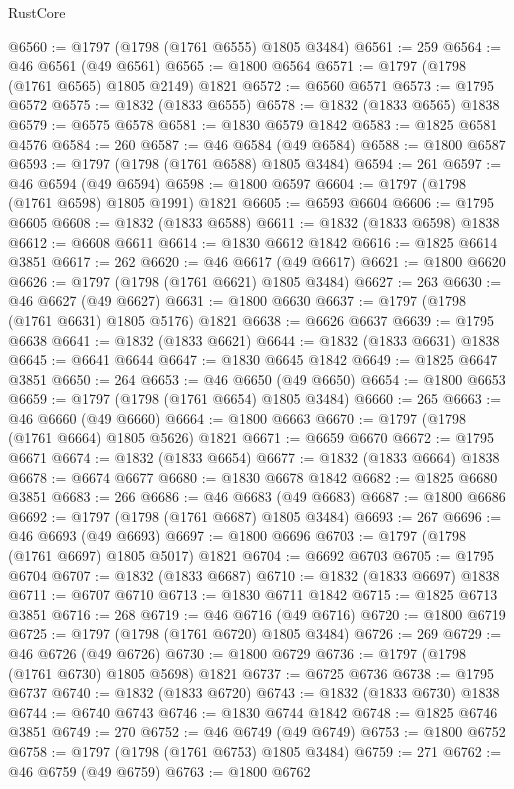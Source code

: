 \begin{lexlean}{RustCore}
\begin{coremodule}
@6560 := @1797 (@1798 (@1761 @6555) @1805 @3484)
@6561 := 259
@6564 := @46 @6561 (@49 @6561)
@6565 := @1800 @6564
@6571 := @1797 (@1798 (@1761 @6565) @1805 @2149) @1821
@6572 := @6560 @6571
@6573 := @1795 @6572
@6575 := @1832 (@1833 @6555)
@6578 := @1832 (@1833 @6565) @1838
@6579 := @6575 @6578
@6581 := @1830 @6579 @1842
@6583 := @1825 @6581 @4576
@6584 := 260
@6587 := @46 @6584 (@49 @6584)
@6588 := @1800 @6587
@6593 := @1797 (@1798 (@1761 @6588) @1805 @3484)
@6594 := 261
@6597 := @46 @6594 (@49 @6594)
@6598 := @1800 @6597
@6604 := @1797 (@1798 (@1761 @6598) @1805 @1991) @1821
@6605 := @6593 @6604
@6606 := @1795 @6605
@6608 := @1832 (@1833 @6588)
@6611 := @1832 (@1833 @6598) @1838
@6612 := @6608 @6611
@6614 := @1830 @6612 @1842
@6616 := @1825 @6614 @3851
@6617 := 262
@6620 := @46 @6617 (@49 @6617)
@6621 := @1800 @6620
@6626 := @1797 (@1798 (@1761 @6621) @1805 @3484)
@6627 := 263
@6630 := @46 @6627 (@49 @6627)
@6631 := @1800 @6630
@6637 := @1797 (@1798 (@1761 @6631) @1805 @5176) @1821
@6638 := @6626 @6637
@6639 := @1795 @6638
@6641 := @1832 (@1833 @6621)
@6644 := @1832 (@1833 @6631) @1838
@6645 := @6641 @6644
@6647 := @1830 @6645 @1842
@6649 := @1825 @6647 @3851
@6650 := 264
@6653 := @46 @6650 (@49 @6650)
@6654 := @1800 @6653
@6659 := @1797 (@1798 (@1761 @6654) @1805 @3484)
@6660 := 265
@6663 := @46 @6660 (@49 @6660)
@6664 := @1800 @6663
@6670 := @1797 (@1798 (@1761 @6664) @1805 @5626) @1821
@6671 := @6659 @6670
@6672 := @1795 @6671
@6674 := @1832 (@1833 @6654)
@6677 := @1832 (@1833 @6664) @1838
@6678 := @6674 @6677
@6680 := @1830 @6678 @1842
@6682 := @1825 @6680 @3851
@6683 := 266
@6686 := @46 @6683 (@49 @6683)
@6687 := @1800 @6686
@6692 := @1797 (@1798 (@1761 @6687) @1805 @3484)
@6693 := 267
@6696 := @46 @6693 (@49 @6693)
@6697 := @1800 @6696
@6703 := @1797 (@1798 (@1761 @6697) @1805 @5017) @1821
@6704 := @6692 @6703
@6705 := @1795 @6704
@6707 := @1832 (@1833 @6687)
@6710 := @1832 (@1833 @6697) @1838
@6711 := @6707 @6710
@6713 := @1830 @6711 @1842
@6715 := @1825 @6713 @3851
@6716 := 268
@6719 := @46 @6716 (@49 @6716)
@6720 := @1800 @6719
@6725 := @1797 (@1798 (@1761 @6720) @1805 @3484)
@6726 := 269
@6729 := @46 @6726 (@49 @6726)
@6730 := @1800 @6729
@6736 := @1797 (@1798 (@1761 @6730) @1805 @5698) @1821
@6737 := @6725 @6736
@6738 := @1795 @6737
@6740 := @1832 (@1833 @6720)
@6743 := @1832 (@1833 @6730) @1838
@6744 := @6740 @6743
@6746 := @1830 @6744 @1842
@6748 := @1825 @6746 @3851
@6749 := 270
@6752 := @46 @6749 (@49 @6749)
@6753 := @1800 @6752
@6758 := @1797 (@1798 (@1761 @6753) @1805 @3484)
@6759 := 271
@6762 := @46 @6759 (@49 @6759)
@6763 := @1800 @6762

\end{coremodule}
\end{lexlean}
